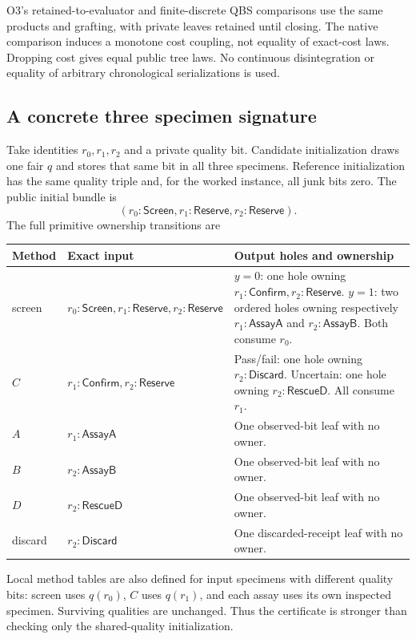 \documentclass[11pt,a4paper]{article}
\theoremstyle{definition}
\begin{document}
O3's retained-to-evaluator and finite-discrete QBS comparisons use the
same products and grafting, with private leaves retained until closing.
The native comparison induces a monotone cost coupling, not equality of
exact-cost laws. Dropping cost gives equal public tree laws. No
continuous disintegration or equality of arbitrary chronological
serializations is used.

\subsection{A concrete three specimen signature}
Take identities $r_0,r_1,r_2$ and a private quality bit. Candidate
initialization draws one fair $q$ and stores that same bit in all three
specimens. Reference initialization has the same quality triple and,
for the worked instance, all junk bits zero. The public initial bundle is
\[
(r_0:\mathsf{Screen},r_1:\mathsf{Reserve},r_2:\mathsf{Reserve}).
\]
The full primitive ownership transitions are
\begin{longtable}{@{}p{.12\linewidth}p{.27\linewidth}p{.53\linewidth}@{}}
\toprule Method&Exact input&Output holes and ownership\\\midrule\endhead
screen&$r_0:\mathsf{Screen},r_1:\mathsf{Reserve},r_2:\mathsf{Reserve}$&
$y=0$: one hole owning $r_1:\mathsf{Confirm},r_2:\mathsf{Reserve}$.
$y=1$: two ordered holes owning respectively $r_1:\mathsf{AssayA}$ and
$r_2:\mathsf{AssayB}$. Both consume $r_0$.\\
$C$&$r_1:\mathsf{Confirm},r_2:\mathsf{Reserve}$&
Pass/fail: one hole owning $r_2:\mathsf{Discard}$.
Uncertain: one hole owning $r_2:\mathsf{RescueD}$. All consume $r_1$.\\
$A$&$r_1:\mathsf{AssayA}$&One observed-bit leaf with no owner.\\
$B$&$r_2:\mathsf{AssayB}$&One observed-bit leaf with no owner.\\
$D$&$r_2:\mathsf{RescueD}$&One observed-bit leaf with no owner.\\
discard&$r_2:\mathsf{Discard}$&One discarded-receipt leaf with no owner.\\
\bottomrule
\end{longtable}
Local method tables are also defined for input specimens with different
quality bits: screen uses $q(r_0)$, $C$ uses $q(r_1)$, and each assay
uses its own inspected specimen. Surviving qualities are unchanged.
Thus the certificate is stronger than checking only the shared-quality
initialization.
\end{document}
